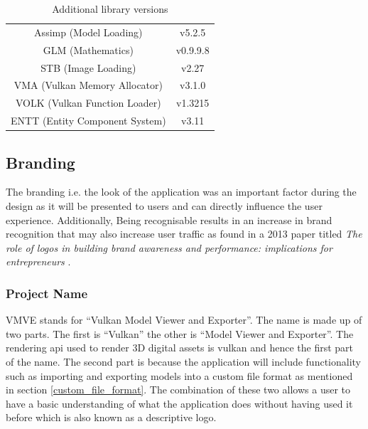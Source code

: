 \documentclass[11pt]{article}
\begin{document}
\begin{table}[H]
  \begin{center}
    \begin{tabular}{cc}
      
      \rowcolor{gray!50}
      Assimp (Model Loading) &  v5.2.5\\
      GLM (Mathematics) &  v0.9.9.8\\
      STB (Image Loading) &  v2.27 \\
      VMA (Vulkan Memory Allocator) &  v3.1.0 \\
      VOLK (Vulkan Function Loader) & v1.3215 \\
      ENTT (Entity Component System) & v3.11 \\
    \end{tabular}
  \end{center}
  \caption{Additional library versions}
  \label{tab:library_versions}
\end{table}

\subsection{Branding}
The branding i.e. the look of the application was an important factor during the
design as it will be presented to users and can directly influence the user
experience. Additionally, Being recognisable results in an increase in brand
recognition that may also increase user traffic as found in a 2013 paper titled
\textit{The role of logos in building brand awareness and performance:
implications for entrepreneurs} \cite{girard2013role}.

\subsubsection{Project Name}
VMVE stands for ``Vulkan Model Viewer and Exporter''. The name is made up of two
parts. The first is ``Vulkan'' the other is ``Model Viewer and Exporter''. The
rendering \gls*{api} used to render 3D digital assets is \gls*{vulkan} and hence
the first part of the name. The second part is because the application will
include functionality such as importing and exporting models into a custom file
format as mentioned in section \ref{custom_file_format}. The combination of
these two allows a user to have a basic understanding of what the application
does without having used it before which is also known as a descriptive logo.
\end{document}
